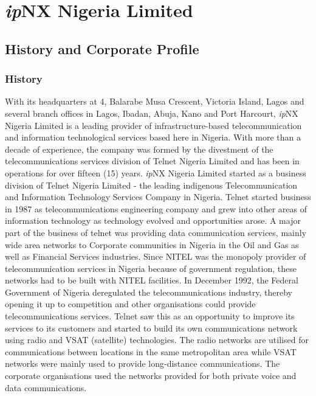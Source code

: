 \chapter{\textit{ip}NX Nigeria Limited}

\section{History and Corporate Profile}
\subsection{History}
With its headquarters at 4, Balarabe Musa
Crescent, Victoria Island, Lagos and several branch offices in Lagos, Ibadan, Abuja, Kano and Port Harcourt, \textit{ip}NX Nigeria Limited is a leading
provider of infrastructure-based telecommunication and information technological services based
here in Nigeria. With more than a decade of experience, the company was formed by the
divestment of the telecommunications services division of Telnet Nigeria Limited and has been in
operations for over fifteen (15) years.
\textit{ip}NX Nigeria Limited started as a business division of Telnet Nigeria Limited - the leading
indigenous Telecommunication and Information Technology Services Company in Nigeria. Telnet
started business in 1987 as telecommunications engineering company and grew into other areas of
information technology as technology evolved and opportunities arose. A major part of the
business of telnet was providing data communication services, mainly wide area networks to
Corporate communities in Nigeria in the Oil and Gas as well as Financial Services industries. Since
NITEL was the monopoly provider of telecommunication services in Nigeria because of government
regulation, these networks had to be built with NITEL facilities.
In December 1992, the Federal Government of Nigeria deregulated the
telecommunications industry, thereby opening it up to competition and other organisations could provide telecommunications services. Telnet saw this as an opportunity to improve its
services to its customers and started to build its own communications network using radio and
VSAT (satellite) technologies.
The radio networks are utilised for communications between locations in the same
metropolitan area while VSAT networks were mainly used to provide long-distance communications. The corporate organisations used the networks provided for both private voice and data communications.\\


